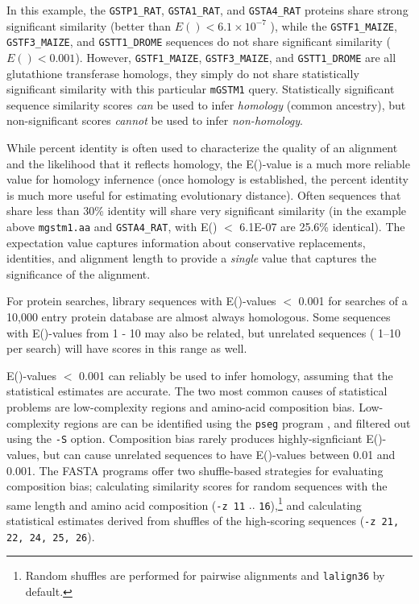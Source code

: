 \documentclass[11pt]{article}
\begin{document}
In this example, the \texttt{GSTP1\_RAT}, \texttt{GSTA1\_RAT}, and
\texttt{GSTA4\_RAT} proteins share strong significant similarity
(better than $E() < 6.1 \times 10^{-7}$ ), while the
\texttt{GSTF1\_MAIZE}, \texttt{GSTF3\_MAIZE}, and
\texttt{GSTT1\_DROME} sequences do not share significant similarity
($E() < 0.001$).  However, \texttt{GSTF1\_MAIZE},
\texttt{GSTF3\_MAIZE}, and \texttt{GSTT1\_DROME} are all glutathione
transferase homologs, they simply do not share statistically
significant similarity with this particular \texttt{mGSTM1} query.
Statistically significant sequence similarity scores \emph{can} be
used to infer \emph{homology} (common ancestry), but non-significant
scores \emph{cannot} be used to infer \emph{non-homology}.

While percent identity is often used to characterize the quality of an
alignment and the likelihood that it reflects homology, the E()-value
is a much more reliable value for homology infernence (once homology is
established, the percent identity is much more useful for estimating
evolutionary distance).  Often sequences that share less than 30\%
identity will share very significant similarity (in the example above
\texttt{mgstm1.aa} and \texttt{GSTA4\_RAT}, with E() $<$ 6.1E-07 are
25.6\% identical).  The expectation value captures information about
conservative replacements, identities, and alignment length to provide
a \emph{single} value that captures the significance of the alignment.

For protein searches, library sequences with E()-values $<$ 0.001 for
searches of a 10,000 entry protein database are almost always
homologous. Some sequences with E()-values from 1 - 10 may also be
related, but unrelated sequences ( 1--10 per search) will have scores
in this range as well.

E()-values $<$ 0.001 can reliably be used to infer homology, assuming
that the statistical estimates are accurate.  The two most common
causes of statistical problems are low-complexity regions and
amino-acid composition bias.  Low-complexity regions are can be
identified using the \texttt{pseg} program \cite{woo935}, and filtered
out using the \texttt{-S} option. Composition bias rarely produces
highly-signficiant E()-values, but can cause unrelated sequences to
have E()-values between 0.01 and 0.001. The FASTA programs offer two
shuffle-based strategies for evaluating composition bias; calculating
similarity scores for random sequences with the same length and amino
acid composition (\texttt{-z 11} $..$ \texttt{16}),\footnote{Random
  shuffles are performed for pairwise alignments and \texttt{lalign36}
  by default.} and calculating statistical estimates derived from
shuffles of the high-scoring sequences (\texttt{-z 21, 22, 24, 25,
  26}).
\end{document}
